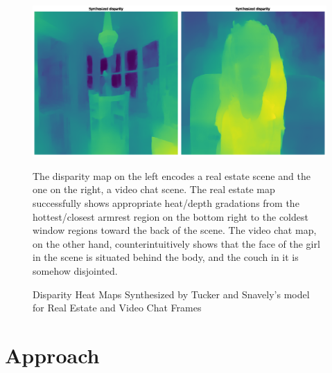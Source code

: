 \begin{figure}[!h]
    \includegraphics[width=1\columnwidth]{figures/great-off-kilter-disparity.png}
    \caption{Disparity Heat Maps Synthesized by Tucker and Snavely's model~\cite{single_view_mpi} for Real Estate and Video Chat Frames}
    \label{fig:great-off-kilter-disparity}
    {\small The disparity map on the left encodes a real estate scene and the one on the right, a video chat scene. The real estate map successfully shows appropriate heat/depth gradations from the hottest/closest armrest region on the bottom right to the coldest window regions toward the back of the scene. The video chat map, on the other hand, counterintuitively shows that the face of the girl in the scene is situated behind the body, and the couch in it is somehow disjointed.}  
\end{figure}

\section{Approach}\label{sec:approach} 

